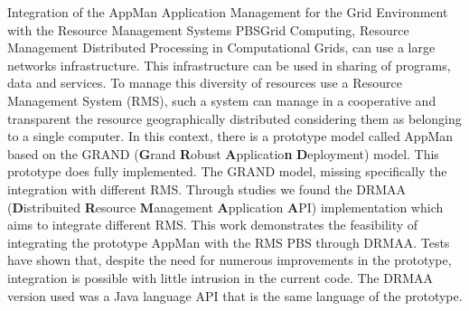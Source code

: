 \begin{englishabstract}{Integration of the AppMan Application Management for the Grid Environment with the Resource Management Systems PBS}{Grid Computing, Resource Management}
Distributed Processing in Computational Grids, can use a large  networks infrastructure. This infrastructure can be used in sharing of programs, data and services. To manage this diversity of resources use a Resource Management System (RMS), such a system can manage in a cooperative and transparent the resource geographically distributed considering them as belonging to a single computer. In this context, there is a prototype model called AppMan based on the GRAND ({\bf G}rand {\bf R}obust {\bf A}pplicatio{\bf n} {\bf D}eployment) model. This prototype does fully implemented. The GRAND model, missing specifically the integration with different RMS. Through studies we found the DRMAA ({\bf D}istribuited {\bf R}esource {\bf M}anagement {\bf A}pplication {\bf A}PI) implementation which aims to integrate different RMS. This work demonstrates the feasibility of integrating the prototype AppMan with the RMS PBS through DRMAA. Tests have shown that, despite the need for numerous improvements in the prototype, integration is possible with little intrusion in the current code. The DRMAA version used was a Java language API that is the same language of the prototype.
\end{englishabstract}